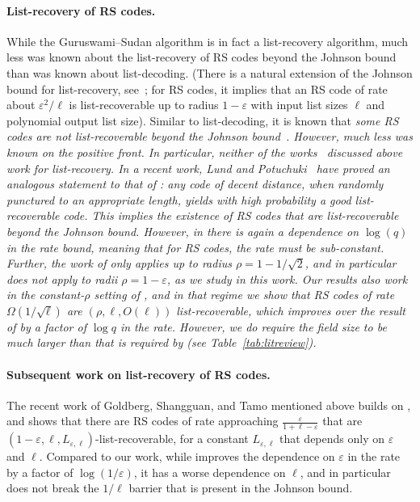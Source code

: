 \documentclass[11pt]{article}
\newcommand\black[1]{{\color{black} #1}}
\renewcommand{\epsilon}{\varepsilon}
\newcommand{\eps}{\epsilon}
\begin{document}
\paragraph{List-recovery of RS codes.} While the Guruswami--Sudan algorithm is in fact a list-recovery algorithm, much less was known about the list-recovery of RS codes beyond the Johnson bound than was known about list-decoding.  (There is a natural extension of the Johnson bound for list-recovery, see~\cite{GS01}; for RS codes, it implies that an RS code of rate about $\eps^2 / \ell$ is list-recoverable up to radius $1 - \eps$ with input list sizes $\ell$ and polynomial output list size).
\black{Similar to list-decoding,} it is known that \em some \em RS codes are not list-recoverable beyond the Johnson bound~\cite{Guruswami-rudra-limits-list-decoding}.  However, much less was known on the positive front.
In particular, neither of the works~\cite{Rudra-Wootters,shangguan2019combinatorial0} discussed above work for list-recovery.  In a recent work, Lund and Potuchuki~\cite{LP20} have proved an analogous statement to that of \cite{Rudra-Wootters}: any code of decent distance, when randomly punctured to an appropriate length, yields with high probability a good list-recoverable code.  This implies the existence of RS codes that are list-recoverable beyond the Johnson bound.
However, in \cite{LP20} there is again a dependence on $\log(q)$ in the rate bound, meaning that for RS codes, the rate must be sub-constant.  Further, the work of \cite{LP20} only applies up to radius $\rho = 1 - 1/\sqrt{2}$, and in particular does not apply to radii $\rho = 1 - \eps$, as we study in this work.  Our results also work in the constant-$\rho$ setting of \cite{LP20}, and in that regime we show that RS codes of rate $\Omega(1/\sqrt{\ell})$ are $(\rho, \ell, O(\ell))$ list-recoverable, which improves over the result of \cite{LP20} by a factor of $\log q$ in the rate.
However, we do require the field size to be much larger than that is required by \cite{LP20} (see Table~\ref{tab:litreview}).


\paragraph{Subsequent work on list-recovery of RS codes.}
The recent work of Goldberg, Shangguan, and Tamo \cite{goldberg2021listdecoding} mentioned above builds on \cite{ferber2020}, and shows that there are RS codes of rate approaching $\frac{\eps}{1 + \ell - \eps}$ that are $(1 - \eps, \ell, L_{\eps, \ell})$-list-recoverable, for a constant $L_{\eps, \ell}$ that depends only on $\eps$ and $\ell$. Compared to our work, while \cite{goldberg2021listdecoding} improves the dependence on $\eps$ in the rate by a factor of $\log(1/\eps)$, it has a worse dependence on $\ell$, and in particular does not break the $1/\ell$ barrier that is present in the Johnson bound.
\end{document}
